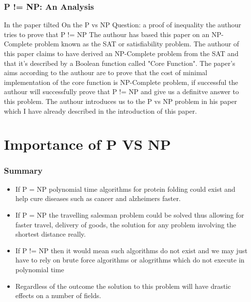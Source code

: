 \documentclass{report}
\begin{document}
\subsection{P != NP: An Analysis}
In the paper tilted On the P vs NP Question: a proof of inequality the authour tries to prove that P != NP\cite{P!=NP} The authour has based this paper on an NP-Complete problem known as the SAT or satisfiability problem\cite{satisfiability}. The authour of this paper claims to have derived an NP-Complete problem from the SAT and that it's described by a Boolean function called "Core Function".  The paper's aims according to the authour are to prove that the cost of minimal implementation of the core function is NP-Complete problem, if successful the authour will successfully prove that P != NP and give us a definitve answer to this problem.  The authour introduces us to the P vs NP problem in his paper which I have already described in the introduction of this paper.
\chapter{Importance of P VS NP}
\subsection{Summary}
\begin{itemize}
  \item If P = NP polynomial time algorithms for protein folding could exist and help cure diseases such as cancer and alzheimers faster.
  \item If P = NP the travelling salesman problem could be solved thus allowing for faster travel, delivery of goods, the solution for any problem involving the shortest distance really.
  \item If P != NP then it would mean such algorithms do not exist and we may just have to rely on brute force algorithms or alogrithms which do not execute in polynomial time
  \item Regardless of the outcome the solution to this problem will have drastic effects on a number of fields.
\end{itemize}
\end{document}
